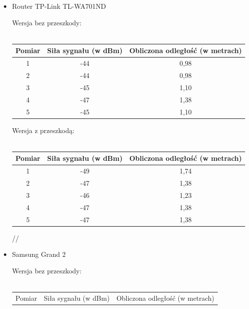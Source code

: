 \begin{itemize}
\begin{center}
\begin{minipage}{\linewidth}
		\end{minipage} 
	\end{center}
	\item Router TP-Link TL-WA701ND
	\begin{center}
		\begin{minipage}{\linewidth}
			Wersja bez przeszkody:\\\\
			\begin{tabular}{|c|c|c|}
				\hline 
				Pomiar & Siła sygnału (w dBm) & Obliczona odległość (w metrach) \\ 
				\hline 
				1 & -44 & 0,98 \\ 
				\hline 
				2 & -44 & 0,98 \\ 
				\hline 
				3 & -45 & 1,10 \\ 
				\hline 
				4 & -47 & 1,38 \\ 
				\hline 
				5 & -45 & 1,10 \\ 
				\hline 
			\end{tabular} 
		\end{minipage} 
	\end{center}
	\begin{center}
		\begin{minipage}{\linewidth}
			Wersja z przeszkodą:\\\\
			\begin{tabular}{|c|c|c|}
				\hline 
				Pomiar & Siła sygnału (w dBm) & Obliczona odległość (w metrach) \\ 
				\hline 
				1 & -49 & 1,74 \\ 
				\hline 
				2 & -47 & 1,38 \\ 
				\hline 
				3 & -46 & 1,23 \\ 
				\hline 
				4 & -47 & 1,38 \\ 
				\hline 
				5 & -47 & 1,38 \\ 
				\hline 
			\end{tabular}//
		\end{minipage} 
	\end{center}
	\item Samsung Grand 2
	\begin{center}
		\begin{minipage}{\linewidth}
			Wersja bez przeszkody:\\\\
			\begin{tabular}{|c|c|c|}
				\hline 
				Pomiar & Siła sygnału (w dBm) & Obliczona odległość (w metrach) \\ 

\end{tabular}
\end{minipage}
\end{center}
\end{itemize}
